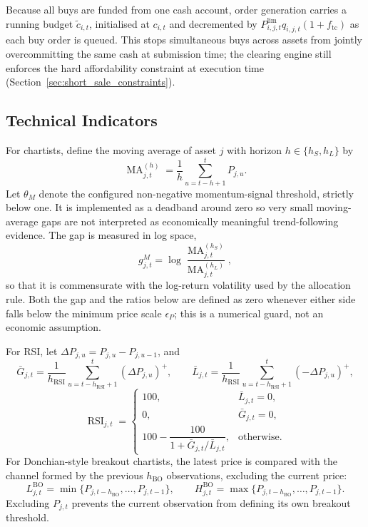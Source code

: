 \documentclass[12pt, a4paper]{article}
\DeclareMathOperator{\MA}{MA}
\DeclareMathOperator{\RSI}{RSI}
\newcommand{\pospart}[1]{\left(#1\right)^{+}}
\begin{document}
    Because all buys are funded from one cash account, order generation carries a
    running budget \(\tilde c_{i,t}\), initialised at \(c_{i,t}\) and decremented
    by \(P_{i,j,t}^{\text{lim}}q_{i,j,t}(1+f_{\mathrm{tc}})\) as each buy order is
    queued. This stops simultaneous buys across assets from jointly
    overcommitting the same cash at submission time; the clearing engine still
    enforces the hard affordability constraint at execution time
    (Section~\ref{sec:short_sale_constraints}).

    \subsection{Technical Indicators}

    For chartists, define the moving average of asset \(j\) with horizon
    \(h\in\{h_S,h_L\}\) by
    \[
        \MA_{j,t}^{(h)}=\frac{1}{h}\sum_{u=t-h+1}^{t}P_{j,u}.
    \]
    Let \(\theta_M\) denote the configured non-negative momentum-signal threshold,
    strictly below one. It is
    implemented as a deadband around zero so very small moving-average gaps are not
    interpreted as economically meaningful trend-following evidence. The gap is
    measured in log space,
    \[
        g_{j,t}^M=\log\frac{\MA_{j,t}^{(h_S)}}{\MA_{j,t}^{(h_L)}},
    \]
    so that it is commensurate with the log-return volatility used by the
    allocation rule. Both the gap and the ratios below are defined as zero
    whenever either side falls below the minimum price scale \(\epsilon_P\); this
    is a numerical guard, not an economic assumption.

    For RSI, let \(\Delta P_{j,u}=P_{j,u}-P_{j,u-1}\), and
    \[
        \bar G_{j,t}=\frac{1}{h_{\mathrm{RSI}}}\sum_{u=t-h_{\mathrm{RSI}}+1}^{t}\pospart{\Delta P_{j,u}},
        \qquad
        \bar L_{j,t}=\frac{1}{h_{\mathrm{RSI}}}\sum_{u=t-h_{\mathrm{RSI}}+1}^{t}\pospart{-\Delta P_{j,u}},
    \]
    \[
        \RSI_{j,t}=
        \begin{cases}
            100, & \bar L_{j,t}=0,\\
            0, & \bar G_{j,t}=0,\\
            100-\dfrac{100}{1+\bar G_{j,t}/\bar L_{j,t}}, & \text{otherwise}.
        \end{cases}
    \]
    For Donchian-style breakout chartists, the latest price is compared with the
    channel formed by the previous \(h_{\mathrm{BO}}\) observations, excluding the
    current price:
    \[
        L_{j,t}^{\mathrm{BO}}=\min\{P_{j,t-h_{\mathrm{BO}}},\ldots,P_{j,t-1}\},
        \qquad
        H_{j,t}^{\mathrm{BO}}=\max\{P_{j,t-h_{\mathrm{BO}}},\ldots,P_{j,t-1}\}.
    \]
    Excluding \(P_{j,t}\) prevents the current observation from defining its own
    breakout threshold.
\end{document}
